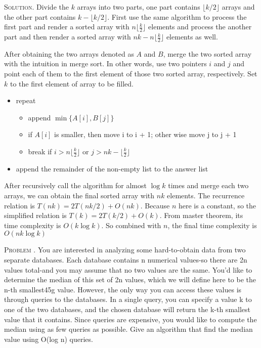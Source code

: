 \documentclass[12pt, a4paper, oneside]{ctexart}
\newcounter{problemname}
\newenvironment{problem}{\stepcounter{problemname}\par\noindent\textsc{Problem \arabic{problemname}. }}{\\\par}
\newenvironment{solution}{\par\noindent\textsc{Solution. }}{\\\par}
\begin{document}
\begin{solution}
    Divide the $k$ arrays into two parts, one part contains $\lfloor k/ 2 \rfloor $ arrays and the other part contains $k - \lfloor k / 2 \rfloor$. First use the same algorithm to process the first part and render a sorted array with $n\lfloor\frac{k}{2}\rfloor$ elements and process the another part and then render a sorted array with $nk-n\lfloor\frac{k}{2}\rfloor$ elements as well. 
    
    After obtaining the two arrays denoted as $A$ and $B$, merge the two sorted array with the intuition in merge sort. In other words, use two pointers $i$ and $j$ and point each of them to the first element of those two sorted array, respectively. Set $k$ to the first element of array to be filled. 
    \begin{itemize}
        \item repeat
        \begin{itemize}
            \item append $\min\{A[i], B[j]\}$
            \item if $A[i]$ is smaller, then move i to i + 1; other wise move j to j + 1
            \item break if $i > n\lfloor \frac{k}{2}\rfloor$ or $j > nk - \lfloor \frac{k}{2}\rfloor$
        \end{itemize}
        \item append the remainder of the non-empty list to the answer list
    \end{itemize}
    After recursively call the algorithm for almost $\log k$ times and merge each two arrays, we can obtain the final sorted array with $nk$ elements. The recurrence relation is $T(nk) = 2T(nk/2) + O(nk)$. Because $n$ here is a constant, so the simplified relation is $T(k) = 2T(k/2) + O(k)$. From master theorem, its time complexity is $O(k\log k)$. So combined with $n$, the final time complexity is $O(nk\log k)$
\end{solution}

\begin{problem}
    You are interested in analyzing some hard-to-obtain data from two separate databases. Each database contains n numerical values-so there are 2n values total-and you may assume that no two values are the same. You’d like to determine the median of this set of 2n values, which we will define here to be the n-th smallest45g value. However, the only way you can access these values is through queries to the databases. In a single query, you can specify a value k to one of the two databases, and the chosen database will return the k-th smallest value that it contains. Since queries are expensive, you would like to compute the median using as few queries as possible. Give an algorithm
that find the median value using O(log n) queries.     
\end{problem}
\end{document}
